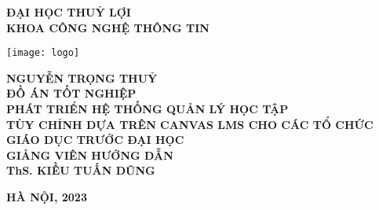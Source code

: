 \documentclass[main-report.tex]{subfiles}
\begin{document}
\begin{titlepage}
\thispagestyle{empty}
\thisfancypage{
\setlength{\fboxsep}{3pt}
\fbox}{} 
\begin{center}
{\bf\large ĐẠI HỌC THUỶ LỢI}\\
{\bf\subtitlesize KHOA CÔNG NGHỆ THÔNG TIN}\\[4cm]

{
\vspace*{-6\baselineskip}
\hspace*{0\textwidth}\texttt{[image: logo]}
\par\vspace*{4\baselineskip}
}
{\bf\large NGUYỄN TRỌNG THUỶ}\\
{\bf\subtitlesize ĐỒ ÁN TỐT NGHIỆP}\\[0.5cm]
{\bf\LARGE PHÁT TRIỂN HỆ THỐNG QUẢN LÝ HỌC TẬP}\\
{\bf\LARGE TÙY CHỈNH DỰA TRÊN CANVAS LMS CHO CÁC TỔ CHỨC GIÁO DỤC TRƯỚC ĐẠI HỌC}\\[5cm]
{\bf GIẢNG VIÊN HƯỚNG DẪN}\\
{\bf ThS. KIỀU TUẤN DŨNG}
\end{center}
\vspace{4cm}
\begin{center}
{\bf HÀ NỘI, 2023}
\end{center}
\end{titlepage}
\end{document}
